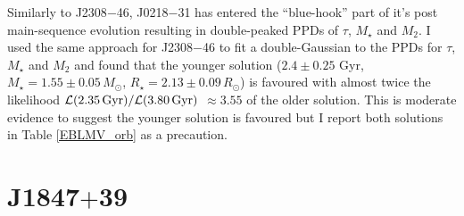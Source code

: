 Similarly to J2308$-$46, J0218$-$31 has entered the ``blue-hook'' part of it's post main-sequence evolution resulting in double-peaked PPDs of $\tau$, $M_{\star}$ and $M_2$. I used the same approach for J2308$-$46 to fit a double-Gaussian to the PPDs for $\tau$, $M_{\star}$ and $M_2$ and found that the younger solution ($2.4 \pm 0.25$ Gyr, $M_{\star} = 1.55 \pm 0.05\,M_{\odot}$, $R_{\star} =  2.13 \pm 0.09\,R_{\odot}$) is favoured with almost twice the likelihood $\mathcal{L}(2.35\, \rm Gyr) / \mathcal{L}(3.80\, \rm Gyr)$ $\approx 3.55$ of the older solution. This is moderate evidence to suggest the younger solution is favoured but I report both solutions in Table \ref{EBLMV_orb} as a precaution. %








\section{J1847$+$39}

